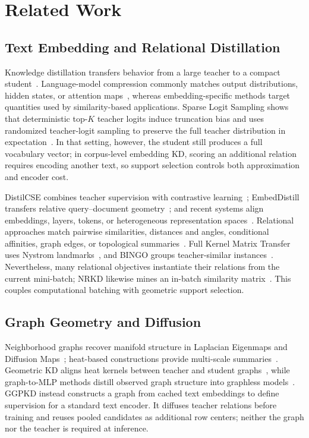 \section{Related Work}

\subsection{Text Embedding and Relational Distillation}
Knowledge distillation transfers behavior from a large teacher to a compact student~\citep{hinton2015distilling}. Language-model compression commonly matches output distributions, hidden states, or attention maps~\citep{sanh2019distilbert,jiao2019tinybert,wang2020minilm,xu2024survey}, whereas embedding-specific methods target quantities used by similarity-based applications. Sparse Logit Sampling shows that deterministic top-$K$ teacher logits induce truncation bias and uses randomized teacher-logit sampling to preserve the full teacher distribution in expectation~\citep{anshumann2025sparse}. In that setting, however, the student still produces a full vocabulary vector; in corpus-level embedding KD, scoring an additional relation requires encoding another text, so support selection controls both approximation and encoder cost.

DistilCSE combines teacher supervision with contrastive learning~\citep{gao2021distilcse,xu2023distillcse}; EmbedDistill transfers relative query--document geometry~\citep{kim2023embeddistill}; and recent systems align embeddings, layers, tokens, or heterogeneous representation spaces~\citep{lee2024gecko,zhang2024jasperstella,vujanic2025leaf,truong2025emo,dao2026talas,akram2026jinaembeddingsv5}. Relational approaches match pairwise similarities, distances and angles, conditional affinities, graph edges, or topological summaries~\citep{tung2019similarity,park2019rkd,passalis2020pkt,liu2019irg,kim2024topkd}. Full Kernel Matrix Transfer uses Nystrom landmarks~\citep{qian2022fullkernel}, and BINGO groups teacher-similar instances~\citep{xu2022bingo}. Nevertheless, many relational objectives instantiate their relations from the current mini-batch; NRKD likewise mines an in-batch similarity matrix~\citep{xin2025nrkd}. This couples computational batching with geometric support selection.

\subsection{Graph Geometry and Diffusion}
Neighborhood graphs recover manifold structure in Laplacian Eigenmaps and Diffusion Maps~\citep{belkin2003laplacian,coifman2006diffusionmaps}; heat-based constructions provide multi-scale summaries~\citep{sun2009hks,huguet2023heatgeo}. Geometric KD aligns heat kernels between teacher and student graphs~\citep{yang2022geometrickd}, while graph-to-MLP methods distill observed graph structure into graphless models~\citep{zhang2022glnn,yang2023graphkd_survey}. GGPKD instead constructs a graph from cached text embeddings to define supervision for a standard text encoder. It diffuses teacher relations before training and reuses pooled candidates as additional row centers; neither the graph nor the teacher is required at inference.
